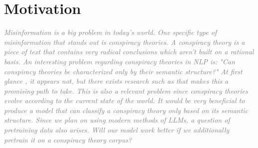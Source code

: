 \documentclass[11pt, a4paper]{article}
\newif\ifinstructions
\newcommand{\explain}[1]{%
  \ifinstructions
    \par\vspace{2pt}%
    {\small\color{exgray} #1}%
    \par\vspace{2pt}%
  \fi
}
\newcommand{\guideline}[1]{%
  \ifinstructions
    \par\vspace{3pt}%
    {\small\color{exgray}\textit{#1}}%
    \par\vspace{1pt}%
  \fi
}
\newcommand{\example}[1]{%
  \ifinstructions
    \par\vspace{1pt}%
    {\small\color{exblue} #1}%
    \par\vspace{4pt}%
  \fi
}
\newcommand{\keyphrase}[1]{%
  \ifinstructions
    \sethlcolor{highlight}\hl{#1}%
  \else
    #1%
  \fi
}
\newcommand{\fillhere}[1]{%
  \par\vspace{2pt}%
  \textit{\textcolor{gray}{#1}}%
  \par\vspace{2pt}%
}
\begin{document}
{%
\section{Motivation}

\explain{If you can bring references to support your claims, do that. Feel free to use the phrases \keyphrase{highlighted in yellow} as is or their paraphrases.}

\guideline{Start big. What is the broad, general problem you are addressing? The bigger the better.}
\example{``The number of NLP publications has grown exponentially over the past decade \citep{joshi2020state, conneau2020xlmr}, and language diversity remains a fundamental challenge for the field.''}

\guideline{What particular, focused problem are you addressing?}
\example{``Despite this growth, the \keyphrase{main goal addressed by this paper} is understanding to what extent current pre-trained models generalize across typologically different languages without task-specific fine-tuning data.''}

\guideline{Why is this an important problem?}
\example{``\keyphrase{It is an important goal because} the majority of the world's languages are low-resource, and excluding them from NLP research perpetuates a language divide with real societal consequences \citep{joshi2020state, lauscher2020zero}.''}

\guideline{Why is this a non-trivial, hard problem?}
\example{``\keyphrase{This is hard to do because} language typology, script systems, and data availability interact in complex ways that make it difficult to predict when and why transfer succeeds or fails.''}

\fillhere{
Misinformation is a big problem in today's world. One specific type of misinformation that stands out is conspiracy theories. A conspiracy theory is a piece of text that contains very radical
conclusions which aren't built on a rational basis. An interesting problem regarding conspiracy theories in NLP is: "Can conspiracy theories be characterized only by their semantic structure?" At
first glance , it appears not, but there exists research such as \citep{fort2023bigfoot} that makes this a promising path to take. This is also a relevant problem since conspiracy theories evolve
according to the current state of the world. It would be very beneficial to produce a model that can classify a conspiracy theory only based on its semantic structure. Since we plan on using modern
methods of LLMs, a question of pretraining data also arises. Will our model work better if we additionally pretrain it on a conspiracy theory corpus?
}

}
\end{document}
